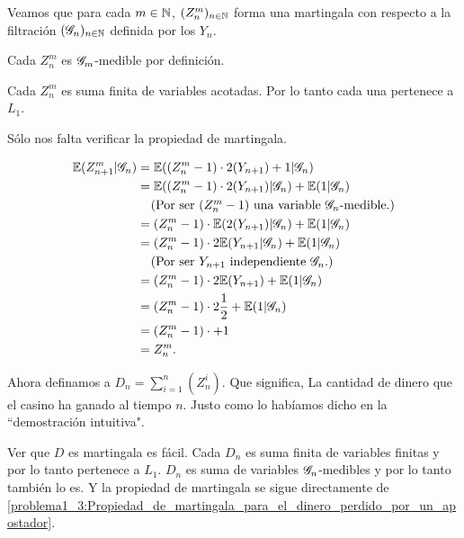 	Veamos que para cada $m \in \mathbb{N}$, $(Z_n^m)_{n \in \mathbb{N}}$ forma una martingala con respecto a la filtración $(\mathscr{G}_n)_{n \in \mathbb{N}}$ 
	definida por los $Y_n$.\par\null
	
	Cada $Z_n^m$ es $\mathscr{G}_m$-medible por definición.\par\null
	
	Cada $Z_n^m$ es suma finita de variables acotadas. Por lo tanto cada una pertenece a $L_1$.\par\null
	
	Sólo nos falta verificar la propiedad de martingala.\par\null
	
	\begin{align}\label{problema1_3:Propiedad_de_martingala_para_el_dinero_perdido_por_un_apostador}
		\mathbb{E}(Z_{n+1}^{m} | \mathscr{G}_n) &= \mathbb{E}((Z_n^{m} - 1) \cdot 2(Y_{n+1}) + 1 | \mathscr{G}_n)\\
							   &= \mathbb{E}((Z_n^{m} -1) \cdot 2(Y_{n+1}) | \mathscr{G}_n) + \mathbb{E}( 1 | \mathscr{G}_n)\\
							   &\;\;\;\;\mbox{(Por ser $(Z_n^{m} - 1)$ una variable $\mathscr{G}_n$-medible.)}\\
							   &= (Z_n^{m} -1) \cdot \mathbb{E}(  2(Y_{n+1}) | \mathscr{G}_n) + \mathbb{E}( 1 | \mathscr{G}_n)\\
							   &= (Z_n^{m} -1) \cdot 2\mathbb{E}( Y_{n+1} | \mathscr{G}_n) + \mathbb{E}( 1 | \mathscr{G}_n)\\
							   &\;\;\;\;\mbox{(Por ser $Y_{n + 1}$ independiente $\mathscr{G}_n$.)}\\
							   &= (Z_n^{m} -1) \cdot 2\mathbb{E}( Y_{n+1}) + \mathbb{E}( 1 | \mathscr{G}_n)\\
							   &= (Z_n^{m} -1) \cdot 2 \frac{1}{2} + \mathbb{E}( 1 | \mathscr{G}_n)\\
							   &= (Z_n^{m} -1) \cdot + 1 \\
							   &= Z_n^m.
	\end{align}\par\null
	
	Ahora definamos a $D_n = \sum_{i=1}^n (Z_n^i)$. Que significa, La cantidad de dinero que el casino ha ganado al tiempo $n$. 
	Justo como lo habíamos dicho en la ``demostración intuitiva".\par\null
	
	Ver que $D$ es martingala es fácil. Cada $D_n$ es suma finita de variables finitas y por lo tanto pertenece a $L_1$.
	$D_n$ es suma de variables $\mathscr{G}_n$-medibles y por lo tanto también lo es. Y la propiedad de martingala se sigue directamente de
	\eqref{problema1_3:Propiedad_de_martingala_para_el_dinero_perdido_por_un_apostador}.\par\null
	
